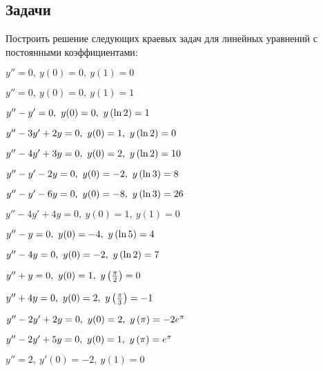 \subsection{Задачи}

	Построить решение следующих краевых задач для линейных уравнений с постоянными коэффициентами:
	\begin{multicols}{2}
		\begin{enumtasks}

			\label{bvp_bvp:constcoeffs_simple}
			\item \( y'' = 0, ~ y(0) = 0, ~ y(1) = 0 \)		%
			\item \( y'' = 0, ~ y(0) = 0, ~ y(1) = 1 \)		%
			\item \( y'' - y' = 0, ~ y(0) = 0, ~ y \left( \ln{2} \right) = 1 \)		%
			\item \( y'' - 3 y' + 2 y = 0, ~ y(0) = 1, ~ y \left( \ln{2} \right) = 0 \)		%
			\item \( y'' - 4 y' + 3 y = 0, ~ y(0) = 2, ~ y \left( \ln{2} \right) = 10 \)		%
			\item \( y'' - y' - 2 y = 0, ~ y(0) = -2, ~ y \left( \ln{3} \right) = 8 \)		%
			\item \( y'' - y' - 6 y = 0, ~ y(0) = -8, ~ y \left( \ln{3} \right) = 26 \)		%
			\item \( y'' - 4 y' + 4 y = 0, ~ y(0) = 1, ~ y(1) = 0 \)		%
			\item \( y'' - y = 0, ~ y(0) = -4, ~ y \left( \ln{5} \right) = 4 \)		%
			\item \( y'' - 4 y = 0, ~ y(0) = -2, ~ y \left( \ln{2} \right) = 7 \)		%
			\item \( y'' + y = 0, ~ y(0) = 1, ~ y \left( \frac{\pi}{2} \right) = 0 \)		%
			\item \( y'' + 4 y = 0, ~ y(0) = 2, ~ y \left( \frac{\pi}{3} \right) = -1 \)		%
			\item \( y'' - 2 y' + 2 y = 0, ~ y(0) = 2, ~ y \left( \pi \right) = - 2 e^{\pi} \)		%
			\item \( y'' - 2 y' + 5 y = 0, ~ y(0) = 1, ~ y \left( \pi \right) = e^{\pi} \)		%
			\item \( y'' = 2, ~ y'(0) = -2, ~ y(1) = 0 \)		%
			
		\end{enumtasks}
	\end{multicols}

